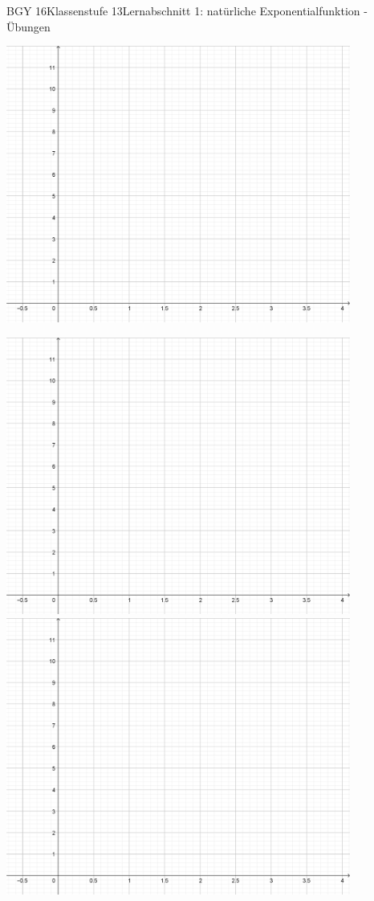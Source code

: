 \documentclass[oneside,openany,headings=optiontotoc,11pt,numbers=noenddot]{scrreprt}
\begin{document}
	\begin{worksheet}{BGY 16}{Klassenstufe 13}{Lernabschnitt 1: natürliche Exponentialfunktion - Übungen}
				
		\noindent
		\sffamily
		\centering
		\includegraphics[width=0.85\textwidth]{../99_Bilder/01_ExpFkt/KoordLeer.png}\\
		\par\bigskip\noindent
		\includegraphics[width=0.85\textwidth]{../99_Bilder/01_ExpFkt/KoordLeer.png}\\
		\newpage
		\includegraphics[width=0.85\textwidth]{../99_Bilder/01_ExpFkt/KoordLeer.png}\\

\end{worksheet}
\end{document}
